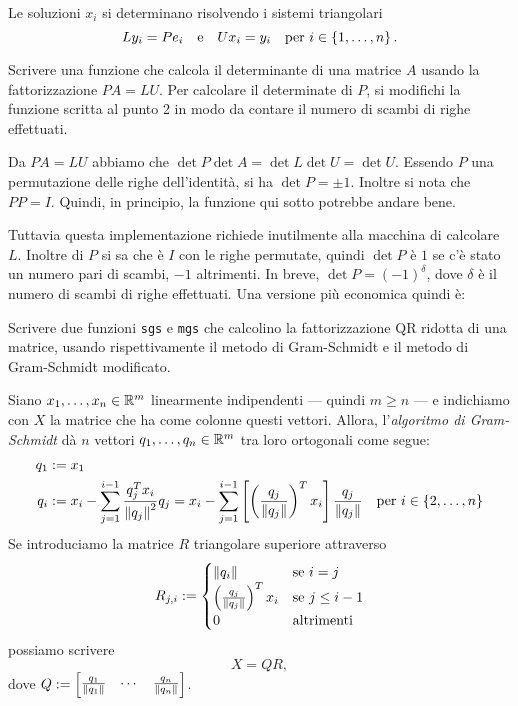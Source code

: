 Le soluzioni \(x_i\) si determinano risolvendo i sistemi triangolari
\[Ly_i = Pe_i \quad\text{e}\quad Ux_i = y_i \quad\text{per } i \in \left\{1, \dots{}, n\right\} .\]



\begin{esercizio}
Scrivere una funzione che calcola il determinante di una matrice \(A\) usando la fattorizzazione \(PA = LU\). Per calcolare il determinate di \(P\), si modifichi la funzione scritta al punto 2 in modo da contare il numero di scambi di righe effettuati.
\end{esercizio}

Da \(PA = LU\) abbiamo che \(\det P \det A = \det L \det U = \det U\). Essendo \(P\) una permutazione delle righe dell'identità, si ha \(\det P = \pm 1\). Inoltre si nota che \(P P = I\). Quindi, in principio, la funzione qui sotto potrebbe andare bene.



Tuttavia questa implementazione richiede inutilmente alla macchina di calcolare \(L\). Inoltre di \(P\) si sa che è \(I\) con le righe permutate, quindi \(\det P\) è \(1\) se c'è stato un numero pari di scambi, \(-1\) altrimenti. In breve, \(\det P = (-1)^\delta\), dove \(\delta\) è il numero di scambi di righe effettuati. Una versione più economica quindi è:




\begin{esercizio}
Scrivere due funzioni \lstinline£sgs£ e \lstinline£mgs£ che calcolino la fattorizzazione QR ridotta di una matrice, usando rispettivamente il metodo di Gram-Schmidt e il metodo di Gram-Schmidt modificato.
\end{esercizio}

Siano \(x_1, \dots{}, x_n \in \mathbb R^m\) linearmente indipendenti --- quindi \(m \ge n\) --- e indichiamo con \(X\) la matrice che ha come colonne questi vettori. Allora, l'{\em algoritmo di Gram-Schmidt} dà \(n\) vettori \(q_1, \dots{}, q_n \in \mathbb R^m\) tra loro ortogonali come segue:
\begin{align*}
q_1 & := x_1 \\
q_i & := x_i - \sum_{j=1}^{i-1} \frac{q_j^T x_i}{\left\lVert q_j \right\rVert^2} q_j = x_i - \sum_{j=1}^{i-1} \left[\left(\frac{q_j}{\left\lVert q_j \right\rVert}\right)^T x_i \right] \frac{q_j}{\left\lVert q_j \right\rVert} \quad\text{per } i \in \left\{2, \dots{}, n\right\}
\end{align*}
%
%
Se introduciamo la matrice \(R\) triangolare superiore attraverso
\[R_{j,i} := \begin{cases} \left\lVert q_i \right\rVert & \text{se } i= j \\ \left(\frac{q_j}{\left\lVert q_j \right\rVert}\right)^T x_i & \text{se } j \le i-1 \\ 0 & \text{altrimenti} \end{cases}\]
possiamo scrivere
\[X = Q R ,\]
dove \(Q := \begin{bmatrix} \frac{q_1}{\left\lVert q_1 \right\rVert} & \cdots{} & \frac{q_n}{\left\lVert q_n \right\rVert} \end{bmatrix}\).

